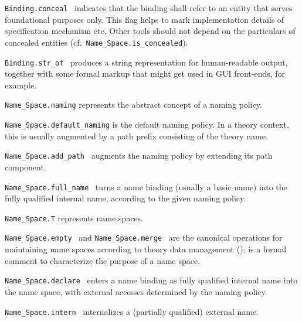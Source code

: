 \begin{isabellebody}
\begin{isamarkuptext}
\begin{description}
  \item \verb|Binding.conceal|~ indicates that the
  binding shall refer to an entity that serves foundational purposes
  only.  This flag helps to mark implementation details of
  specification mechanism etc.  Other tools should not depend on the
  particulars of concealed entities (cf.\ \verb|Name_Space.is_concealed|).

  \item \verb|Binding.str_of|~ produces a string
  representation for human-readable output, together with some formal
  markup that might get used in GUI front-ends, for example.

  \item \verb|Name_Space.naming| represents the abstract concept of
  a naming policy.

  \item \verb|Name_Space.default_naming| is the default naming policy.
  In a theory context, this is usually augmented by a path prefix
  consisting of the theory name.

  \item \verb|Name_Space.add_path|~ augments the
  naming policy by extending its path component.

  \item \verb|Name_Space.full_name|~ turns a
  name binding (usually a basic name) into the fully qualified
  internal name, according to the given naming policy.

  \item \verb|Name_Space.T| represents name spaces.

  \item \verb|Name_Space.empty|~ and \verb|Name_Space.merge|~ are the canonical operations for
  maintaining name spaces according to theory data management
  ();  is a formal comment
  to characterize the purpose of a name space.

  \item \verb|Name_Space.declare|~ enters a name binding as fully qualified internal name into
  the name space, with external accesses determined by the naming
  policy.

  \item \verb|Name_Space.intern|~ internalizes a
  (partially qualified) external name.


\end{description}
\end{isamarkuptext}
\end{isabellebody}
